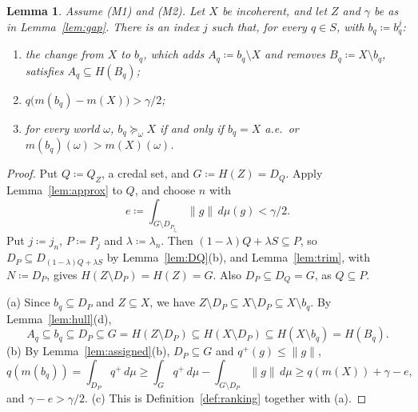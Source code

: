 \documentclass[11pt]{article}
\newtheorem{lemma}[theorem]{Lemma}
\theoremstyle{definition}
\begin{document}
\begin{lemma}\label{lem:choice}
Assume (M1) and (M2). Let $X$ be incoherent, and let $Z$ and $\gamma$ be as in Lemma~\ref{lem:gap}. There is an index $j$ such that, for every $q\in S$, with $b_q\coloneqq b^j_q$:
\begin{enumerate}[label=(\alph*)]
\item the change from $X$ to $b_q$, which adds $A_q\coloneqq b_q\setminus X$ and removes $B_q\coloneqq X\setminus b_q$, satisfies $A_q\subseteq H(B_q)$;
\item $q\bigl(m(b_q)-m(X)\bigr)>\gamma/2$;
\item for every world $\omega$, $b_q\succeq_\omega X$ if and only if $b_q=X$ a.e.\ or $m(b_q)(\omega)>m(X)(\omega)$.
\end{enumerate}
\end{lemma}
\begin{proof}
Put $Q\coloneqq Q_Z$, a credal set, and $G\coloneqq H(Z)=D_Q$. Apply Lemma~\ref{lem:approx} to $Q$, and choose $n$ with
\[
e\coloneqq\int_{G\setminus D_{P_{j_n}}}\|g\|\,d\mu(g)<\gamma/2 .
\]
Put $j\coloneqq j_n$, $P\coloneqq P_j$ and $\lambda\coloneqq\lambda_n$. Then $(1-\lambda)Q+\lambda S\subseteq P$, so $D_P\subseteq D_{(1-\lambda)Q+\lambda S}$ by Lemma~\ref{lem:DQ}(b), and Lemma~\ref{lem:trim}, with $N\coloneqq D_P$, gives $H(Z\setminus D_P)=H(Z)=G$. Also $D_P\subseteq D_Q=G$, as $Q\subseteq P$.

(a) Since $b_q\subseteq D_P$ and $Z\subseteq X$, we have $Z\setminus D_P\subseteq X\setminus D_P\subseteq X\setminus b_q$. By Lemma~\ref{lem:hull}(d),
\[
A_q\subseteq b_q\subseteq D_P\subseteq G=H(Z\setminus D_P)\subseteq H(X\setminus D_P)\subseteq H(X\setminus b_q)=H(B_q).
\]
(b) By Lemma~\ref{lem:assigned}(b), $D_P\subseteq G$ and $q^+(g)\le\|g\|$,
\[
q(m(b_q))=\int_{D_P}q^+\,d\mu\ge\int_Gq^+\,d\mu-\int_{G\setminus D_P}\|g\|\,d\mu\ge q(m(X))+\gamma-e,
\]
and $\gamma-e>\gamma/2$.
(c) This is Definition~\ref{def:ranking} together with (a).
\end{proof}
\end{document}
